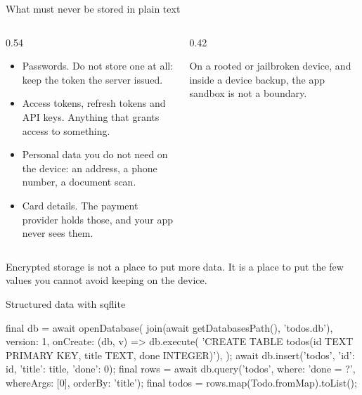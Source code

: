 \documentclass[10pt,aspectratio=169,t]{beamer}
\begin{document}
\begin{frame}[eyebrow=Storage]{What must never be stored in plain text}
  \begin{columns}[T]
    \begin{column}{0.54\textwidth}
      \vskip 1mm
      \begin{itemize}
        \item Passwords. Do not store one at all: keep the token the server issued.
        \item Access tokens, refresh tokens and API keys. Anything that grants access to something.
        \item Personal data you do not need on the device: an address, a phone number, a document scan.
        \item Card details. The payment provider holds those, and your app never sees them.
      \end{itemize}
    \end{column}
    \begin{column}{0.42\textwidth}
      \vskip 1mm
      \begin{warning}
        On a rooted or jailbroken device, and inside a device backup, the app sandbox is not a boundary.
      \end{warning}
      \vskip 2mm
    \end{column}
  \end{columns}
  \begin{takeaway}{Encrypted storage is not a place to put more data.}
    It is a place to put the few values you cannot avoid keeping on the device.
  \end{takeaway}
\end{frame}

\begin{frame}[fragile,eyebrow=Storage]{Structured data with sqflite}
\begin{dart}
final db = await openDatabase(
  join(await getDatabasesPath(), 'todos.db'),
  version: 1,
  onCreate: (db, v) => db.execute(
    'CREATE TABLE todos(id TEXT PRIMARY KEY, title TEXT, done INTEGER)'),
);
await db.insert('todos', {'id': id, 'title': title, 'done': 0});
final rows = await db.query('todos',
    where: 'done = ?', whereArgs: [0], orderBy: 'title');
final todos = rows.map(Todo.fromMap).toList();
\end{dart}
  \vskip 2mm
\end{frame}
\end{document}
